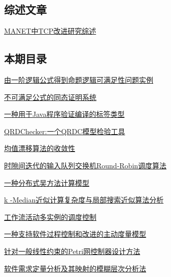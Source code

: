 \documentclass[a4paper]{article}
\begin{document}
\subsection{综述文章}
\href{http://www.jos.org.cn/ch/reader/download_pdf.aspx?file_no=20050313&year_id=2005&quarter_id=3&falg=1}{MANET中TCP改进研究综述}

\subsection{本期目录}
\href{http://www.jos.org.cn/ch/reader/download_pdf.aspx?file_no=20050301&year_id=2005&quarter_id=3&falg=1}{由一阶逻辑公式得到命题逻辑可满足性问题实例}

\href{http://www.jos.org.cn/ch/reader/download_pdf.aspx?file_no=20050302&year_id=2005&quarter_id=3&falg=1}{不可满足公式的同态证明系统}

\href{http://www.jos.org.cn/ch/reader/download_pdf.aspx?file_no=20050303&year_id=2005&quarter_id=3&falg=1}{一种用于Java程序验证编译的标签类型}

\href{http://www.jos.org.cn/ch/reader/download_pdf.aspx?file_no=20050304&year_id=2005&quarter_id=3&falg=1}{QRDChecker:一个QRDC模型检验工具}

\href{http://www.jos.org.cn/ch/reader/download_pdf.aspx?file_no=20050305&year_id=2005&quarter_id=3&falg=1}{均值漂移算法的收敛性}

\href{http://www.jos.org.cn/ch/reader/download_pdf.aspx?file_no=20050306&year_id=2005&quarter_id=3&falg=1}{时隙间迭代的输入队列交换机Round-Robin调度算法}

\href{http://www.jos.org.cn/ch/reader/download_pdf.aspx?file_no=20050307&year_id=2005&quarter_id=3&falg=1}{一种分布式吴方法计算模型}

\href{http://www.jos.org.cn/ch/reader/download_pdf.aspx?file_no=20050308&year_id=2005&quarter_id=3&falg=1}{k -Median近似计算复杂度与局部搜索近似算法分析}

\href{http://www.jos.org.cn/ch/reader/download_pdf.aspx?file_no=20050309&year_id=2005&quarter_id=3&falg=1}{工作流活动多实例的调度控制}

\href{http://www.jos.org.cn/ch/reader/download_pdf.aspx?file_no=20050310&year_id=2005&quarter_id=3&falg=1}{一种支持软件过程控制和改进的主动度量模型}

\href{http://www.jos.org.cn/ch/reader/download_pdf.aspx?file_no=20050311&year_id=2005&quarter_id=3&falg=1}{针对一般线性约束的Petri网控制器设计方法}

\href{http://www.jos.org.cn/ch/reader/download_pdf.aspx?file_no=20050312&year_id=2005&quarter_id=3&falg=1}{软件需求定量分析及其映射的模糊层次分析法}
\end{document}
